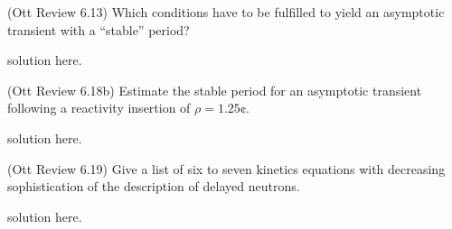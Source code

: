 \documentclass[11pt,addpoints,answers]{exam}
\begin{document}
\begin{questions}

        \question[5] (Ott Review 6.13) Which conditions have to be fulfilled to 
        yield an asymptotic transient with a ``stable'' period?
        \begin{solution}
                solution here.
        \end{solution}

        
        \question[10] (Ott Review 6.18b) Estimate the stable period for an 
        asymptotic transient following a reactivity insertion of $\rho = 
        1.25\cent$.
        \begin{solution}
                solution here.
        \end{solution}


        \question[10] (Ott Review 6.19) Give a list of six to seven 
        kinetics equations with decreasing sophistication of the description of 
        delayed neutrons.
        \begin{solution}
                solution here.
        \end{solution}
        
\end{questions}



%
%
\end{document}
